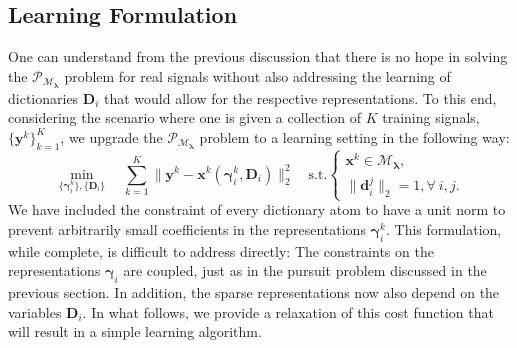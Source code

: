 \documentclass[10pt,journal]{IEEEtran}
\def\x{{\mathbf x}}
\def\d{{\mathbf d}}
\def\y{{\mathbf y}}
\def\D{{\mathbf D}}
\def\M{{\mathcal{M}}}
\def\P{{\mathcal{P}}}
\def\gama{{\boldsymbol \gamma}}
\def\lamda{{\boldsymbol \lambda}}
\def\PM{{\P_{\M_\lamda}}}
\theoremstyle{plain}
\theoremstyle{definition}
\begin{document}
\subsection{Learning Formulation}
\label{subsec:Learning}

One can understand from the previous discussion that there is no hope in solving the $\PM$ problem for real signals without also addressing the learning of dictionaries $\D_i$ that would allow for the respective representations. To this end, considering the scenario where one is given a collection of $K$ training signals, $\{\y^k\}_{k=1}^K$, we upgrade the $\PM$ problem to a learning setting in the following way:
\begin{equation}
	\min_{ \{\gama^k_i\},\{\D_i\}} \quad \sum_{k=1}^K \| \y^k - \x^k(\gama^k_i,\D_i) \|^2_2 \quad \text{s.t.} \left\{
	\begin{array}{c}
		\x^k \in\mathcal{M}_\lamda, \\
		\|\d^j_i\|_2 = 1, \forall \ i,j.
	\end{array}
\right.		
\label{Eq:FirstLearningProblemm}
\end{equation}
We have included the constraint of every dictionary atom to have a unit norm to prevent arbitrarily small coefficients in the representations $\gama_i^k$. This formulation, while complete, is difficult to address directly: The constraints on the representations $\gama_i$ are coupled, just as in the pursuit problem discussed in the previous section. In addition, the sparse representations now also depend on the variables $\D_i$. In what follows, we provide a relaxation of this cost function that will result in a simple learning algorithm.
\end{document}
